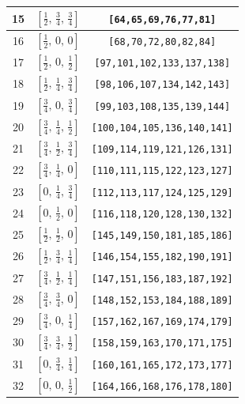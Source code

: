 \documentclass[fleqn,8pt]{jsarticle}
\begin{document}
\begin{longtable}{ccc}
15 & $\left[ \frac{1}{2},\, \frac{3}{4},\, \frac{3}{4} \right]$ & {\tt [64,65,69,76,77,81]} \\ \hline
16 & $\left[ \frac{1}{2},\, 0,\, 0 \right]$ & {\tt [68,70,72,80,82,84]} \\ \hline
17 & $\left[ \frac{1}{2},\, 0,\, \frac{1}{2} \right]$ & {\tt [97,101,102,133,137,138]} \\ \hline
18 & $\left[ \frac{1}{2},\, \frac{1}{4},\, \frac{3}{4} \right]$ & {\tt [98,106,107,134,142,143]} \\ \hline
19 & $\left[ \frac{3}{4},\, 0,\, \frac{3}{4} \right]$ & {\tt [99,103,108,135,139,144]} \\ \hline
20 & $\left[ \frac{3}{4},\, \frac{1}{4},\, \frac{1}{2} \right]$ & {\tt [100,104,105,136,140,141]} \\ \hline
21 & $\left[ \frac{3}{4},\, \frac{1}{2},\, \frac{3}{4} \right]$ & {\tt [109,114,119,121,126,131]} \\ \hline
22 & $\left[ \frac{3}{4},\, \frac{1}{4},\, 0 \right]$ & {\tt [110,111,115,122,123,127]} \\ \hline
23 & $\left[ 0,\, \frac{1}{4},\, \frac{3}{4} \right]$ & {\tt [112,113,117,124,125,129]} \\ \hline
24 & $\left[ 0,\, \frac{1}{2},\, 0 \right]$ & {\tt [116,118,120,128,130,132]} \\ \hline
25 & $\left[ \frac{1}{2},\, \frac{1}{2},\, 0 \right]$ & {\tt [145,149,150,181,185,186]} \\ \hline
26 & $\left[ \frac{1}{2},\, \frac{3}{4},\, \frac{1}{4} \right]$ & {\tt [146,154,155,182,190,191]} \\ \hline
27 & $\left[ \frac{3}{4},\, \frac{1}{2},\, \frac{1}{4} \right]$ & {\tt [147,151,156,183,187,192]} \\ \hline
28 & $\left[ \frac{3}{4},\, \frac{3}{4},\, 0 \right]$ & {\tt [148,152,153,184,188,189]} \\ \hline
29 & $\left[ \frac{3}{4},\, 0,\, \frac{1}{4} \right]$ & {\tt [157,162,167,169,174,179]} \\ \hline
30 & $\left[ \frac{3}{4},\, \frac{3}{4},\, \frac{1}{2} \right]$ & {\tt [158,159,163,170,171,175]} \\ \hline
31 & $\left[ 0,\, \frac{3}{4},\, \frac{1}{4} \right]$ & {\tt [160,161,165,172,173,177]} \\ \hline
32 & $\left[ 0,\, 0,\, \frac{1}{2} \right]$ & {\tt [164,166,168,176,178,180]} \\
\end{longtable}
\renewcommand{\arraystretch}{1.2}
\end{document}
